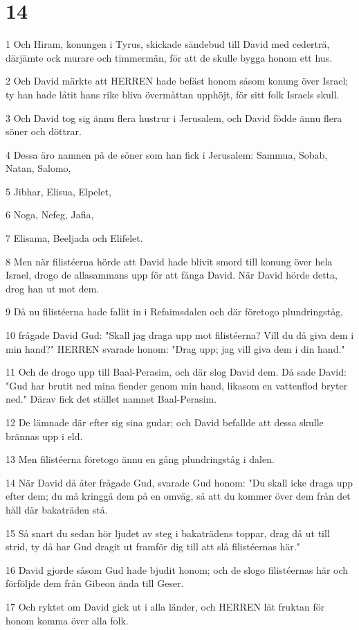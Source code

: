 \chapter{14}

\par 1 Och Hiram, konungen i Tyrus, skickade sändebud till David med cederträ, därjämte ock murare och timmermän, för att de skulle bygga honom ett hus.
\par 2 Och David märkte att HERREN hade befäst honom såsom konung över Israel; ty han hade låtit hans rike bliva övermåttan upphöjt, för sitt folk Israels skull.
\par 3 Och David tog sig ännu flera hustrur i Jerusalem, och David födde ännu flera söner och döttrar.
\par 4 Dessa äro namnen på de söner som han fick i Jerusalem: Sammua, Sobab, Natan, Salomo,
\par 5 Jibhar, Elisua, Elpelet,
\par 6 Noga, Nefeg, Jafia,
\par 7 Elisama, Beeljada och Elifelet.
\par 8 Men när filistéerna hörde att David hade blivit smord till konung över hela Israel, drogo de allasammans upp för att fånga David. När David hörde detta, drog han ut mot dem.
\par 9 Då nu filistéerna hade fallit in i Refaimsdalen och där företogo plundringståg,
\par 10 frågade David Gud: "Skall jag draga upp mot filistéerna? Vill du då giva dem i min hand?" HERREN svarade honom: "Drag upp; jag vill giva dem i din hand."
\par 11 Och de drogo upp till Baal-Perasim, och där slog David dem. Då sade David: "Gud har brutit ned mina fiender genom min hand, likasom en vattenflod bryter ned." Därav fick det stället namnet Baal-Perasim.
\par 12 De lämnade där efter sig sina gudar; och David befallde att dessa skulle brännas upp i eld.
\par 13 Men filistéerna företogo ännu en gång plundringståg i dalen.
\par 14 När David då åter frågade Gud, svarade Gud honom: "Du skall icke draga upp efter dem; du må kringgå dem på en omväg, så att du kommer över dem från det håll där bakaträden stå.
\par 15 Så snart du sedan hör ljudet av steg i bakaträdens toppar, drag då ut till strid, ty då har Gud dragit ut framför dig till att slå filistéernas här."
\par 16 David gjorde såsom Gud hade bjudit honom; och de slogo filistéernas här och förföljde dem från Gibeon ända till Geser.
\par 17 Och ryktet om David gick ut i alla länder, och HERREN lät fruktan för honom komma över alla folk.

